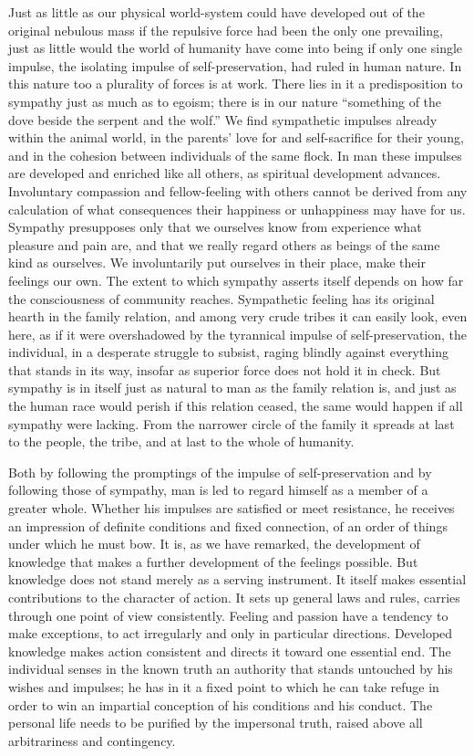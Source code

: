 \documentclass[12pt,a4paper,openany]{book}
\newcommand{\opage}[1]{\marginnote{\footnotesize\textit{[#1]}}}
\begin{document}
Just as little as our physical world-system could have developed out of the
original nebulous mass if the repulsive force had been the only one
prevailing, just as little would the world of humanity have come into being
if only one single impulse, the isolating impulse of self-preservation, had
ruled in human nature. In this nature too a plurality of forces is at work.
There lies in it a predisposition to sympathy just as much as to egoism;
there is in our nature ``something of the dove beside the serpent and the
wolf.'' We find sympathetic impulses already within the animal world, in
the parents' love for and self-sacrifice for their young, and in the
cohesion between individuals of the same flock. In man these impulses are
developed and enriched like all others, as spiritual development advances.
Involuntary compassion and fellow-feeling with others cannot be derived
from any calculation of what consequences their happiness or unhappiness
may have for us. Sympathy presupposes only that we ourselves know from
experience what pleasure and pain are, and that we really regard others as
beings of the same kind as ourselves. We involuntarily put ourselves in
their place, make their feelings our own. The extent to which sympathy
asserts itself depends on how far the consciousness of community reaches.
Sympathetic feeling has its original hearth in the family relation, and
among very crude tribes it can easily look, even here, \opage{14}as if it
were overshadowed by the tyrannical impulse of self-preservation, the
individual, in a desperate struggle to subsist, raging blindly against
everything that stands in its way, insofar as superior force does not hold
it in check. But sympathy is in itself just as natural to man as the family
relation is, and just as the human race would perish if %
this relation ceased, the same would happen if all sympathy were lacking.
From the narrower circle of the family it spreads at last to the people,
the tribe, and at last to the whole of humanity.

Both by following the promptings of the impulse of self-preservation and by
following those of sympathy, man is led to regard himself as a member of a
greater whole. Whether his impulses are satisfied or meet resistance, he
receives an impression of definite conditions and fixed connection, of an
order of things under which he must bow. It is, as we have remarked, the
development of knowledge that makes a further development of the feelings
possible. But knowledge does not stand merely as a serving instrument. It
itself makes essential contributions to the character of action. It sets
up general laws and rules, carries through one point of view consistently.
Feeling and passion have a tendency to make exceptions, to act irregularly
and only in particular directions. Developed knowledge makes action
consistent and directs it toward one essential end. The individual senses
in the known truth an authority that stands untouched by his wishes and
impulses; he has in it a fixed point to which he can take \opage{15}refuge
in order to win an impartial conception of his conditions and his conduct.
The personal life needs to be purified by the impersonal truth, raised
above all arbitrariness and contingency.
\end{document}
